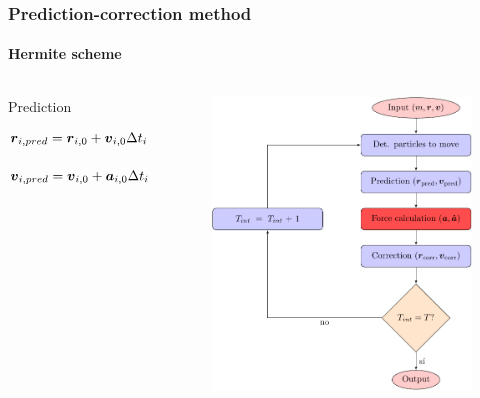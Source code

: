\begin{frame}
    \frametitle{Prediction-correction method}
    \framesubtitle{Hermite scheme}
    \begin{columns}
        \begin{column}{0.5\textwidth}
        \begin{block}{Prediction}
        \footnotesize
        \begin{dmath}
            \bs{r}_{i,pred} = \bs{r}_{i,0} +
                            \bs{v}_{i,0} \Delta t_{i}  +
                            \frac{1}{2!} \bs{a}_{i,0} \Delta t^{2}_{i} +
                            \frac{1}{3!} \bs{\dot{a}}_{i,0} \Delta t^{3}_{i}
        \end{dmath}
        \begin{dmath}
            \bs{v}_{i,pred} = \bs{v}_{i,0} +
                            \bs{a}_{i,0} \Delta t_{i}  +
                            \frac{1}{2!} \bs{\dot{a}}_{i,0} \Delta t^{2}_{i}
        \end{dmath}

        \end{block}
        \end{column}
        \begin{column}{0.5\textwidth}
            \begin{figure}
                \centering
                \includegraphics[height=0.7\textheight]{diagrams/algorithm}
                \label{fig:algoritmo}
            \end{figure}
        \end{column}
    \end{columns}
\end{frame}


